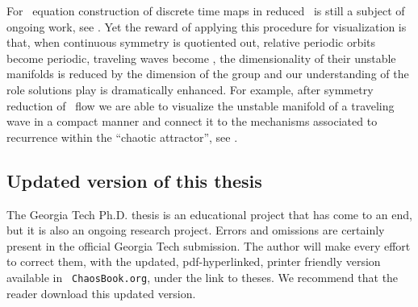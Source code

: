 For \KS\ equation construction of discrete time maps in
reduced \statesp\ is still a subject of ongoing work, see
. Yet the reward of applying this
procedure for visualization is that, when continuous symmetry
is quotiented out, relative periodic orbits become periodic,
traveling waves become \eqva, the dimensionality of their
unstable manifolds is reduced by the dimension of the group
and our understanding of the role solutions play is
dramatically enhanced.
For example, after symmetry reduction of
\KS\ flow we are able to visualize the unstable manifold of a
traveling wave in a compact manner and connect it to the
mechanisms associated to recurrence within the
``chaotic attractor'', see .

\subsection{Updated version of this thesis}

The Georgia Tech Ph.D. thesis is an educational project that
has come to an end, but it is also an ongoing research
project. Errors and omissions are certainly present in
the official Georgia Tech submission. The author will make
every effort to correct them, with the updated,
pdf-hyperlinked, printer friendly version available in {\tt
ChaosBook.org}, under the link to theses. We recommend
that the reader download this updated version.
